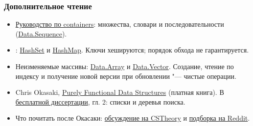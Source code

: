 \documentclass[11pt]{beamer}
\begin{document}
\begin{frame}
  \frametitle{Дополнительное чтение}
  \begin{itemize}
    \item \href{https://haskell-containers.readthedocs.io/en/latest/}{Руководство по containers}: множества, словари и последовательности (\href{https://hackage.haskell.org/package/containers/docs/Data-Sequence.html}{Data.Sequence}).
    \item {}: \href{https://hackage.haskell.org/package/unordered-containers/docs/Data-HashSet.html}{HashSet} и \href{https://hackage.haskell.org/package/unordered-containers/docs/Data-HashMap-Strict.html}{HashMap}. Ключи хешируются; порядок обхода не гарантируется.
    \item Неизменяемые массивы: \href{https://hackage.haskell.org/package/array/docs/Data-Array.html}{Data.Array} и \href{https://hackage.haskell.org/package/vector/docs/Data-Vector.html}{Data.Vector}. Создание, чтение по индексу и получение новой версии при обновлении "--- чистые операции.
    \item Chris Okasaki, \href{https://www.cambridge.org/core/books/purely-functional-data-structures/0409255DA1B48FA731859AC72E34D494}{Purely Functional Data Structures} (платная книга). В \href{https://www.cs.cmu.edu/~rwh/students/okasaki.pdf}{бесплатной диссертации}, гл. 2: списки и деревья поиска.
    \item Что почитать после Окасаки: \href{https://cstheory.stackexchange.com/questions/1539/whats-new-in-purely-functional-data-structures-since-okasaki}{обсуждение на CSTheory} и \href{https://www.reddit.com/r/haskell/comments/a4wk1i/seminal_works_after_purely_functional_data/ebm30ra/}{подборка на Reddit}.
  \end{itemize}
\end{frame}
\end{document}
